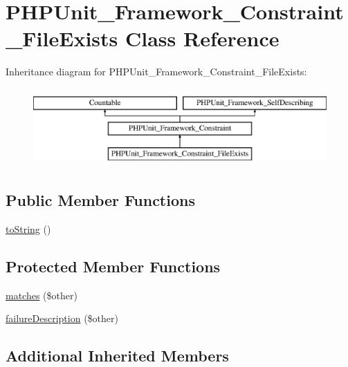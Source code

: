 \hypertarget{class_p_h_p_unit___framework___constraint___file_exists}{}\section{P\+H\+P\+Unit\+\_\+\+Framework\+\_\+\+Constraint\+\_\+\+File\+Exists Class Reference}
\label{class_p_h_p_unit___framework___constraint___file_exists}
Inheritance diagram for P\+H\+P\+Unit\+\_\+\+Framework\+\_\+\+Constraint\+\_\+\+File\+Exists\+:\begin{figure}[H]
\begin{center}
\leavevmode
\includegraphics[height=3.000000cm]{class_p_h_p_unit___framework___constraint___file_exists}
\end{center}
\end{figure}
\subsection*{Public Member Functions}
\begin{DoxyCompactItemize}
\item 
\mbox{\hyperlink{class_p_h_p_unit___framework___constraint___file_exists_a5558c5d549f41597377fa1ea8a1cefa3}{to\+String}} ()
\end{DoxyCompactItemize}
\subsection*{Protected Member Functions}
\begin{DoxyCompactItemize}
\item 
\mbox{\hyperlink{class_p_h_p_unit___framework___constraint___file_exists_a9c9c337de483bbdbb9fa249a6c7c9cc5}{matches}} (\$other)
\item 
\mbox{\hyperlink{class_p_h_p_unit___framework___constraint___file_exists_aaabb679273bfb812df4d81c283754a59}{failure\+Description}} (\$other)
\end{DoxyCompactItemize}
\subsection*{Additional Inherited Members}



